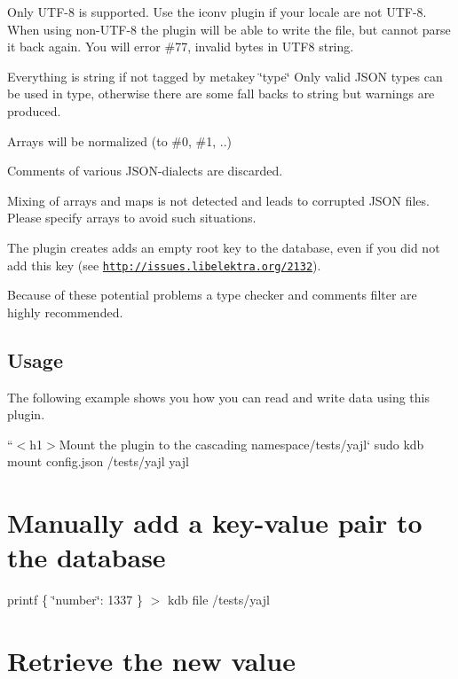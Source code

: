 \begin{DoxyItemize}
\item Only U\+T\+F-\/8 is supported. Use the {\ttfamily iconv} plugin if your locale are not U\+T\+F-\/8. When using non-\/\+U\+T\+F-\/8 the plugin will be able to write the file, but cannot parse it back again. You will error \#77, invalid bytes in U\+T\+F8 string.
\item Everything is string if not tagged by metakey \char`\"{}type\char`\"{} Only valid J\+S\+ON types can be used in type, otherwise there are some fall backs to string but warnings are produced.
\item Arrays will be normalized (to \#0, \#1, ..)
\item Comments of various J\+S\+O\+N-\/dialects are discarded.
\item Mixing of arrays and maps is not detected and leads to corrupted J\+S\+ON files. Please specify arrays to avoid such situations.
\item The plugin creates adds an empty root key to the database, even if you did not add this key (see \href{http://issues.libelektra.org/2132}{\tt http\+://issues.\+libelektra.\+org/2132}).
\end{DoxyItemize}

Because of these potential problems a type checker and comments filter are highly recommended.

\subsection*{Usage}

The following example shows you how you can read and write data using this plugin.

``{\ttfamily  $<$h1$>$Mount the plugin to the cascading namespace}/tests/yajl` sudo kdb mount config.\+json /tests/yajl yajl

\section*{Manually add a key-\/value pair to the database}

printf \textquotesingle{}\{ \char`\"{}number\char`\"{}\+: 1337 \}\textquotesingle{} $>$ {\ttfamily kdb file /tests/yajl}

\section*{Retrieve the new value}

